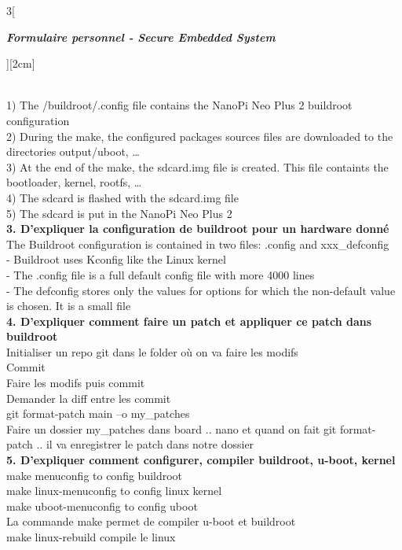 \begin{multicols}{3}[\centerline{ \large\em \textbf{Formulaire personnel - Secure Embedded System}}][2cm]
\begin{minipage}{\linewidth}
\end{minipage}\\
1) The /buildroot/.config file contains the NanoPi Neo Plus 2 buildroot configuration\\
2) During the make, the configured packages sources files are downloaded to the
directories output/uboot, …\\
3) At the end of the make, the sdcard.img file is created. This file containts the bootloader, kernel, rootfs, …\\
4) The sdcard is flashed with the sdcard.img file\\
5) The sdcard is put in the NanoPi Neo Plus 2 \\
\textbf{3. D’expliquer la configuration de buildroot pour un hardware donné\\}
The Buildroot configuration is contained in two files: .config and xxx\_defconfig\\
- Buildroot uses Kconfig like the Linux kernel\\
- The .config file is a full default config file with more 4000 lines\\
- The defconfig stores only the values for options for which the non-default value is chosen. It is a small file 
\\ \textbf{4. D’expliquer comment faire un patch et appliquer ce patch dans buildroot\\}
Initialiser un repo git dans le folder où on va faire les modifs\\
Commit\\
Faire les modifs puis commit\\
Demander la diff entre les commit\\
git format-patch main –o my\_patches\\
Faire un dossier my\_patches dans board .. nano et quand on fait git format-patch .. il va enregistrer le patch dans notre dossier
\\ \textbf{5. D’expliquer comment configurer, compiler buildroot, u-boot, kernel\\}
make menuconfig to config buildroot\\
make linux-menuconfig to config linux kernel\\
make uboot-menuconfig to config uboot\\
La commande make permet de compiler u-boot et buildroot\\
make linux-rebuild compile le linux
\\

\end{multicols}
